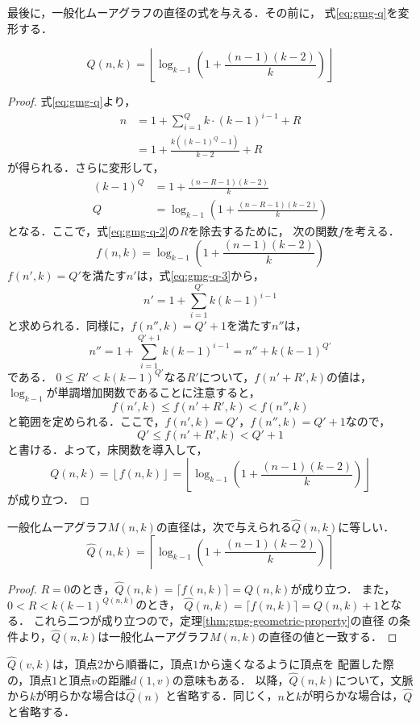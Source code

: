 最後に，一般化ムーアグラフの直径の式を与える．その前に，
式\ref{eq:gmg-q}を変形する．
\begin{lemma}
  \label{lem:gmg-q}
  \begin{equation}
    Q(n,k) = \left\lfloor
    \log_{k-1}\left(1+\frac{(n-1)(k-2)}{k}\right)\right\rfloor
  \end{equation}
\end{lemma}
\begin{proof}
  式\ref{eq:gmg-q}より，
  \begin{align}
    n &= 1 + \sum_{i=1}^Qk\cdot(k-1)^{i-1} + R \nonumber\\
    &= 1 + \frac{k\left((k-1)^{Q}-1\right)}{k-2} + R
    \label{eq:gmg-q-1}
  \end{align}
  が得られる．さらに変形して，
  \begin{align}
    (k-1)^Q &= 1+\frac{(n-R-1)(k-2)}{k} \nonumber\\
    Q &= \log_{k-1}\left(1+\frac{(n-R-1)(k-2)}{k}\right)
    \label{eq:gmg-q-2}
  \end{align}
  となる．ここで，式\ref{eq:gmg-q-2}の$R$を除去するために，
  次の関数$f$を考える．
  \begin{equation}
    \label{eq:gmg-q-3}
    f(n,k) = \log_{k-1}\left(1+\frac{(n-1)(k-2)}{k}\right)
  \end{equation}
  $f(n',k)=Q'$を満たす$n'$は，式\ref{eq:gmg-q-3}から，
  \[ n'=1+\sum_{i=1}^{Q'}k(k-1)^{i-1} \]
  と求められる．同様に，$f(n'',k)=Q'+1$を満たす$n''$は，
  \[ n''=1+\sum_{i=1}^{Q'+1}k(k-1)^{i-1} = n''+k(k-1)^{Q'} \]
  である．
  $0\leq R' < k(k-1)^{Q'}$なる$R'$について，$f(n'+R',k)$の値は，
  $\log_{k-1}$が単調増加関数であることに注意すると，
  \[ f(n',k) \leq f(n'+R',k) < f(n'',k) \]
  と範囲を定められる．ここで，$f(n',k)=Q'$，$f(n'',k)=Q'+1$なので，
  \begin{equation}
    \label{eq:gmg-q-4}
    Q' \leq f(n'+R',k) < Q'+1
  \end{equation}
  と書ける．よって，床関数を導入して，
  \[ Q(n,k) = \left\lfloor f(n,k)\right\rfloor
  = \left\lfloor\log_{k-1}\left(1+\frac{(n-1)(k-2)}{k}\right)\right\rfloor \]
  が成り立つ．
\end{proof}

\begin{theorem}
  \label{thm:gmg-diam}
  一般化ムーアグラフ$M(n,k)$の直径は，次で与えられる$\hat{Q}(n,k)$に等しい．
  \begin{equation}
    \hat{Q}(n,k)=
    \left\lceil\log_{k-1}\left(1+\frac{(n-1)(k-2)}{k}\right)\right\rceil
  \end{equation}
\end{theorem}
\begin{proof}
  $R=0$のとき，$\hat{Q}(n,k)=\lceil f(n,k)\rceil=Q(n,k)$が成り立つ．
  また，$0<R<k(k-1)^{Q(n,k)}$のとき，
  $\hat{Q}(n,k)=\lceil f(n,k)\rceil=Q(n,k)+1$となる．
  これら二つが成り立つので，定理\ref{thm:gmg-geometric-property}の直径
  の条件より，$\hat{Q}(n,k)$は一般化ムーアグラフ$M(n,k)$の直径の値と一致する．
\end{proof}
$\hat{Q}(v,k)$は，頂点$2$から順番に，頂点$1$から遠くなるように頂点を
配置した際の，頂点$1$と頂点$v$の距離$d(1,v)$の意味もある．
以降，$\hat{Q}(n,k)$について，文脈から$k$が明らかな場合は$\hat{Q}(n)$
と省略する．同じく，$n$と$k$が明らかな場合は，$\hat{Q}$と省略する．
